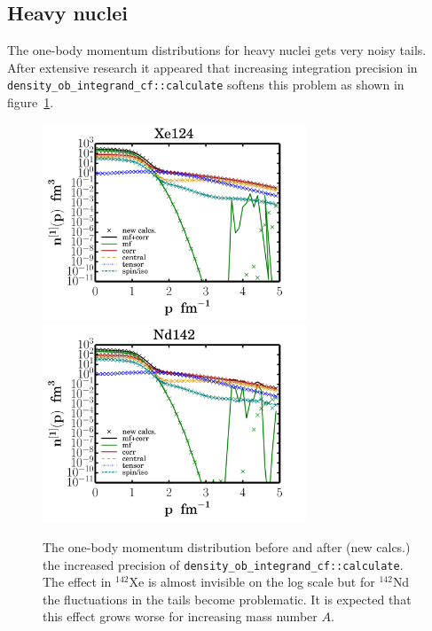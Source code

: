 \documentclass[10pt]{article}
\begin{document}
\subsection{Heavy nuclei}

The one-body momentum distributions for heavy nuclei gets very noisy tails.
After extensive research it appeared that increasing integration precision
in \texttt{density\_ob\_integrand\_cf::calculate} softens this problem as shown in
figure~\ref{fig:ob_bad_tails}.


\begin{figure}
\centering
\includegraphics[width=0.7\textwidth]{figures/ob_Xe124_comparison.pdf}
\includegraphics[width=0.7\textwidth]{figures/ob_Nd142_comparison.pdf}
\caption{The one-body momentum distribution before and after (new calcs.) the increased precision of \texttt{density\_ob\_integrand\_cf::calculate}.
The effect in $^{142}$Xe is almost invisible on the log scale but for $^{142}$Nd the fluctuations in
the tails become problematic. It is expected that this effect grows worse for increasing mass number $A$.}
\label{fig:ob_bad_tails}
\end{figure}
\end{document}
